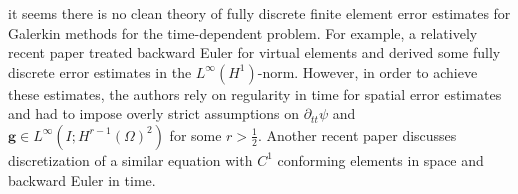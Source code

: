\documentclass{m2an}
\newcommand{\1}{\mathds{1}}
\newcommand{\g}{\mathbf{g}}
\newcommand{\Om}{\Omega}
\theoremstyle{definition}
\begin{document}
it seems there is no clean theory of fully discrete finite element error estimates for Galerkin methods for the time-dependent problem.
For example, a relatively recent paper \cite{AdakD_MoraD_NatarajanS_SilgadoA_2021} treated backward Euler for virtual elements and derived some fully discrete error estimates in the $L^\infty(H^1)$-norm. 
However, in order to achieve these estimates, the authors rely on regularity in time for spatial error estimates
and had to impose overly strict assumptions on 
$\partial_{tt} \psi$ and $\g \in L^\infty(I;H^{r-1}(\Om)^2)$ for some $r>\frac12$.
Another recent paper \cite{KimQuasiGeostrophic2025} discusses discretization of a similar equation with $C^1$ conforming elements in space and backward Euler in time. %
\end{document}
